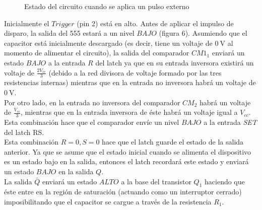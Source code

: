 \documentclass{article}
\begin{document}
\begin{figure}[H]
{}
	\caption{Estado del circuito cuando se aplica un pulso externo}	
	\label{fig:figura7}
\end{figure}

Inicialmente el $Trigger$ (pin 2) está en alto. Antes de aplicar el impulso de disparo, la salida del 555 estará a un nivel $BAJO$ (figura 6). Asumiendo que el capacitor está inicialmente descargado (es decir, tiene un voltaje de $\qty{0}{\volt}$ al momento de alimentar el circuito), la salida del comparador $CM1_1$ enviará un estado $BAJO$ a la entrada $R$ del latch ya que en su entrada inversora existirá un voltaje de $\frac{2V_{{cc}}}{3}$ (debido a la red divisora de voltaje formado por las tres resistencias internas) mientras que en la entrada no inversora habrá un voltaje de $\qty{0}{\volt}$. \\

\noindent Por otro lado, en la entrada no inversora del comparador $CM_2$ habrá un voltaje de $\frac{V_{cc}}{3}$, mientras que en la entrada inversora de éste habrá un voltaje igual a $V_{cc}$. Esta combinación hace que el comparador envíe un nivel $BAJO$ a la entrada \textit{SET} del latch RS. \\

\noindent Esta combinación $R=0, S=0$ hace que el latch guarde el estado de la salida anterior. Ya que se asume que el estado inicial cuando se alimenta el dispositivo es un estado bajo en la salida, entonces el latch recordará este estado  y enviará un estado $BAJO$ en la salida $Q$. \\

\noindent La salida $\bar{Q}$ enviará un estado $ALTO$ a la base del transistor $Q_1$ haciendo que éste entre en la región de saturación (actuando como un interruptor cerrado) imposibilitando que el capacitor se cargue a través de la resistencia $R_1$. \\
\end{document}
